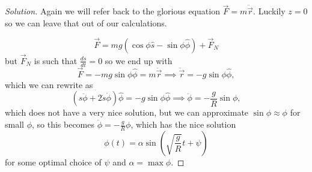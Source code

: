 \begin{proof}[Solution]
Again we will refer back to the glorious equation $\vec{F} = m
\ddot{\vec{r}}$. Luckily $z = 0$ so we can leave that out of our
calculations.

\[ \vec{F} = mg(\cos \phi \hat{s} - \sin \phi \hat{\phi}) + \vec{F}_N \]
but $\vec{F}_N$ is such that $\frac{ds}{dt} = 0$ so we end up with
\[ \vec{F} = -mg \sin \phi \hat{\phi} = m \ddot{\vec{r}} \implies
\ddot{\vec{r}} = -g \sin \phi \hat{\phi}, \]
which we can rewrite as
\[ \left(s \ddot{\phi} + 2 \dot{s} \dot{\phi} \right) \hat{\phi} = -g
\sin \phi \hat{\phi} \implies \ddot{\phi} = -\frac{g}{R} \sin \phi, \]
which does not have a very nice solution, but we can approximate $\sin
\phi \approx \phi$ for small $\phi$, so this becomes $\ddot{\phi} =
-\frac{g}{R} \phi$, which has the nice solution
\[ \phi(t) = \alpha \sin\left( \sqrt{\frac{g}{R}} t + \psi \right) \]
for some optimal choice of $\psi$ and $\alpha = \max \phi$.
\end{proof}
